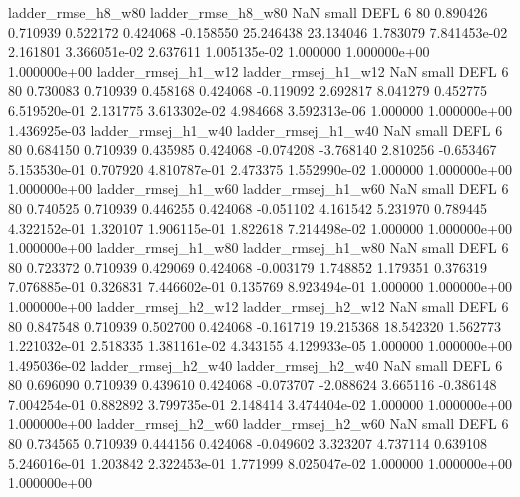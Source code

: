       ladder_rmse_h8_w80       ladder_rmse_h8_w80                   NaN      small     DEFL                 6 80 0.890426       0.710939 0.522172       0.424068   -0.158550     25.246438     23.134046     1.783079   7.841453e-02  2.161801 3.366051e-02     2.637611   1.005135e-02            1.000000    1.000000e+00        1.000000e+00
     ladder_rmsej_h1_w12      ladder_rmsej_h1_w12                   NaN      small     DEFL                 6 80 0.730083       0.710939 0.458168       0.424068   -0.119092      2.692817      8.041279     0.452775   6.519520e-01  2.131775 3.613302e-02     4.984668   3.592313e-06            1.000000    1.000000e+00        1.436925e-03
     ladder_rmsej_h1_w40      ladder_rmsej_h1_w40                   NaN      small     DEFL                 6 80 0.684150       0.710939 0.435985       0.424068   -0.074208     -3.768140      2.810256    -0.653467   5.153530e-01  0.707920 4.810787e-01     2.473375   1.552990e-02            1.000000    1.000000e+00        1.000000e+00
     ladder_rmsej_h1_w60      ladder_rmsej_h1_w60                   NaN      small     DEFL                 6 80 0.740525       0.710939 0.446255       0.424068   -0.051102      4.161542      5.231970     0.789445   4.322152e-01  1.320107 1.906115e-01     1.822618   7.214498e-02            1.000000    1.000000e+00        1.000000e+00
     ladder_rmsej_h1_w80      ladder_rmsej_h1_w80                   NaN      small     DEFL                 6 80 0.723372       0.710939 0.429069       0.424068   -0.003179      1.748852      1.179351     0.376319   7.076885e-01  0.326831 7.446602e-01     0.135769   8.923494e-01            1.000000    1.000000e+00        1.000000e+00
     ladder_rmsej_h2_w12      ladder_rmsej_h2_w12                   NaN      small     DEFL                 6 80 0.847548       0.710939 0.502700       0.424068   -0.161719     19.215368     18.542320     1.562773   1.221032e-01  2.518335 1.381161e-02     4.343155   4.129933e-05            1.000000    1.000000e+00        1.495036e-02
     ladder_rmsej_h2_w40      ladder_rmsej_h2_w40                   NaN      small     DEFL                 6 80 0.696090       0.710939 0.439610       0.424068   -0.073707     -2.088624      3.665116    -0.386148   7.004254e-01  0.882892 3.799735e-01     2.148414   3.474404e-02            1.000000    1.000000e+00        1.000000e+00
     ladder_rmsej_h2_w60      ladder_rmsej_h2_w60                   NaN      small     DEFL                 6 80 0.734565       0.710939 0.444156       0.424068   -0.049602      3.323207      4.737114     0.639108   5.246016e-01  1.203842 2.322453e-01     1.771999   8.025047e-02            1.000000    1.000000e+00        1.000000e+00
